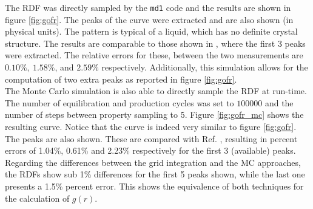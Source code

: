 \documentclass[%
aps,
pra,%
amsmath,amssymb,
preprint,%
reprint,%
notitlepage,
a4paper]{revtex4-1}
\newcommand{\md}{\texttt{md1} }
\begin{document}
The RDF was directly sampled by the \md code and the results are shown in figure \ref{fig:gofr}. The peaks of the curve were extracted  and are also shown (in physical units). The pattern is typical of a liquid, which has no definite crystal structure\cite{Simon2013}. The results are comparable to those shown in \textcite{Rahman1964}, where the first 3 peaks were extracted. The relative errors for these, between the two measurements are $0.10\%,\ 1.58\%$, and $2.59\%$ respectively. Additionally, this simulation allows for the computation of two extra peaks as reported in figure \ref{fig:gofr}.\\
The Monte Carlo simulation is also able to directly sample the RDF at run-time. The number of equilibration and production cycles was set to $\num{100000}$ and the number of steps between property sampling to 5. Figure \ref{fig:gofr_mc} shows the resulting curve. Notice that the curve is indeed very similar to figure \ref{fig:gofr}. The peaks are also shown. These are compared with Ref. \cite{Rahman1964}, resulting in percent errors of 1.04\%, 0.61\% and 2.23\% respectively for the first 3 (available) peaks. Regarding the differences between the grid integration and the MC approaches, the RDFs show sub 1\% differences for the first 5 peaks shown, while the last one presents a 1.5\% percent error. This shows the equivalence of both techniques for the calculation of $g(r)$.
\end{document}
